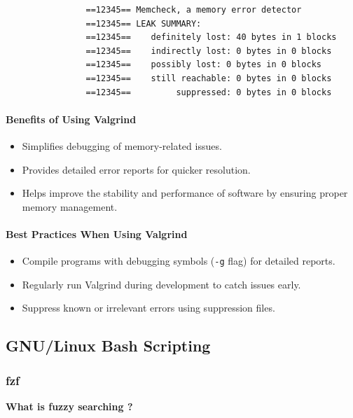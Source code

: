 \documentclass[12pt]{article}
\begin{document}
            \begin{lstlisting}
                ==12345== Memcheck, a memory error detector
                ==12345== LEAK SUMMARY:
                ==12345==    definitely lost: 40 bytes in 1 blocks
                ==12345==    indirectly lost: 0 bytes in 0 blocks
                ==12345==    possibly lost: 0 bytes in 0 blocks
                ==12345==    still reachable: 0 bytes in 0 blocks
                ==12345==         suppressed: 0 bytes in 0 blocks
            \end{lstlisting}
            
            \paragraph{Benefits of Using Valgrind}
            \begin{itemize}
                \item Simplifies debugging of memory-related issues.
                \item Provides detailed error reports for quicker resolution.
                \item Helps improve the stability and performance of software by ensuring proper memory management.
            \end{itemize}
            
            \paragraph{Best Practices When Using Valgrind}
            \begin{itemize}
                \item Compile programs with debugging symbols (\texttt{-g} flag) for detailed reports.
                \item Regularly run Valgrind during development to catch issues early.
                \item Suppress known or irrelevant errors using suppression files.
            \end{itemize}
            

    \subsection{GNU/Linux Bash Scripting}
        \subsubsection{fzf}
            \textbf{What is fuzzy searching ?}
\end{document}
